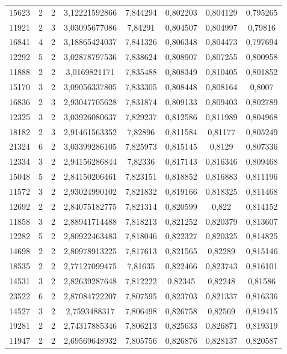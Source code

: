 \begin{longtable}{|c|c|c|c|c|c|c|c|}
15623 & 2 & 2 & 3,12221592866 & 7,844294 & 0,802203 & 0,804129 & 0,795265 \\
11921 & 2 & 3 & 3,03095677086 & 7,84291 & 0,804507 & 0,804997 & 0,79816 \\
16841 & 4 & 2 & 3,18865424037 & 7,841326 & 0,806348 & 0,804473 & 0,797694 \\
12292 & 5 & 2 & 3,02878797536 & 7,838624 & 0,808907 & 0,807255 & 0,800958 \\
11888 & 2 & 2 & 3,0169821171 & 7,835488 & 0,808349 & 0,810405 & 0,801852 \\
15170 & 3 & 2 & 3,09056337805 & 7,833305 & 0,808448 & 0,808164 & 0,8007 \\
16836 & 2 & 3 & 2,93047705628 & 7,831874 & 0,809133 & 0,809403 & 0,802789 \\
12325 & 3 & 2 & 3,03926080637 & 7,829237 & 0,812586 & 0,811989 & 0,804968 \\
18182 & 2 & 3 & 2,91461563352 & 7,82896 & 0,811584 & 0,81177 & 0,805249 \\
21324 & 6 & 2 & 3,03399286105 & 7,825973 & 0,815145 & 0,8129 & 0,807336 \\
12334 & 3 & 2 & 2,94156286844 & 7,82336 & 0,817143 & 0,816346 & 0,809468 \\
15048 & 5 & 2 & 2,84150206461 & 7,823151 & 0,818852 & 0,816883 & 0,811196 \\
11572 & 3 & 2 & 2,93024990102 & 7,821832 & 0,819166 & 0,818325 & 0,811468 \\
12692 & 2 & 2 & 2,84075182775 & 7,821314 & 0,820599 & 0,822 & 0,814152 \\
11858 & 3 & 2 & 2,88941714488 & 7,818213 & 0,821252 & 0,820379 & 0,813607 \\
12282 & 5 & 2 & 2,80922463483 & 7,818046 & 0,822327 & 0,820325 & 0,814825 \\
14698 & 2 & 2 & 2,80978913225 & 7,817613 & 0,821565 & 0,82289 & 0,815146 \\
18535 & 2 & 2 & 2,77127099475 & 7,81635 & 0,822466 & 0,823743 & 0,816101 \\
14531 & 3 & 2 & 2,82639287648 & 7,812222 & 0,82345 & 0,82248 & 0,81586 \\
23522 & 6 & 2 & 2,87084722207 & 7,807595 & 0,823703 & 0,821337 & 0,816336 \\
14527 & 3 & 2 & 2,7593488317 & 7,806498 & 0,826758 & 0,82569 & 0,819415 \\
19281 & 2 & 2 & 2,74317885346 & 7,806213 & 0,825633 & 0,826871 & 0,819319 \\
11947 & 2 & 2 & 2,69569648932 & 7,805756 & 0,826876 & 0,828137 & 0,820587 \\

\end{longtable}
